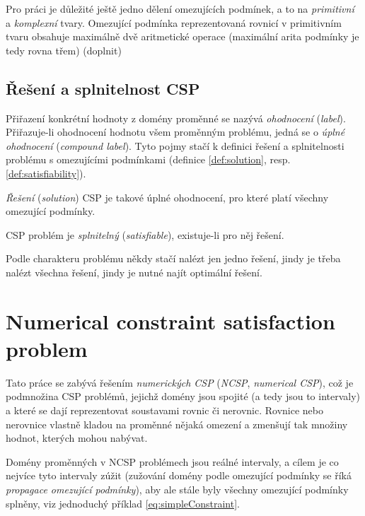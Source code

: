 Pro práci je důležité ještě jedno dělení omezujících podmínek, a to na \emph{primitivní} a \emph{komplexní} tvary. Omezující podmínka reprezentovaná rovnicí v primitivním tvaru obsahuje maximálně dvě aritmetické operace (maximální arita podmínky je tedy rovna třem) (doplnit)

\subsection{Řešení a splnitelnost CSP}
Přiřazení konkrétní hodnoty z domény proměnné se nazývá \emph{ohodnocení} (\emph{label}). Přiřazuje-li ohodnocení hodnotu všem proměnným problému, jedná se o \emph{úplné ohodnocení} (\emph{compound label}). Tyto pojmy stačí k definici řešení a splnitelnosti problému s omezujícími podmínkami (definice \ref{def:solution}, resp. \ref{def:satisfiability}).

\begin{definition}
\label{def:solution}
\emph{Řešení} (\emph{solution}) CSP je takové úplné ohodnocení, pro které platí všechny omezující podmínky.
\end{definition}

\begin{definition}
\label{def:satisfiability}
CSP problém je \emph{splnitelný} (\emph{satisfiable}), existuje-li pro něj řešení.
\end{definition}

Podle charakteru problému někdy stačí nalézt jen jedno řešení, jindy je třeba nalézt všechna řešení, jindy je nutné najít optimální řešení.


\section{Numerical constraint satisfaction problem}

Tato práce se zabývá řešením \emph{numerických CSP} (\emph{NCSP}, \emph{numerical CSP}), což je podmnožina CSP problémů, jejichž domény jsou spojité (a tedy jsou to intervaly) a které se dají reprezentovat soustavami rovnic či nerovnic. Rovnice nebo nerovnice vlastně kladou na proměnné nějaká omezení a zmenšují tak množiny hodnot, kterých mohou nabývat.

Domény proměnných v NCSP problémech jsou reálné intervaly, a cílem je co nejvíce tyto intervaly zúžit (zužování domény podle omezující podmínky se říká \emph{propagace omezující podmínky}), aby ale stále byly všechny omezující podmínky splněny, viz jednoduchý příklad \ref{eq:simpleConstraint}.

